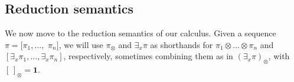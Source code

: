\documentclass{llncs}
\def\1{{\mathbf 1}}
\newcommand{\tell}{{\bf tell}}
\newcommand{\ask}{{\bf ask}}
\newcommand{\ostop}{{\bf stop}}
\def\1{{\mathbf 1}}
\begin{document}

\subsection{Reduction semantics}
We now move to the reduction semantics of our calculus. 
%
Given a sequence $\pi = [\pi_1, \ldots,$ $\pi_n]$, we will use 
$\pi_\otimes$ and $\exists_x \pi$
as shorthands for $\pi_1 \otimes \ldots \otimes \pi_n$ and
$[\exists_x \pi_1, \ldots, \exists_x \pi_n]$, respectively,
sometimes combining them as in $(\exists_x \pi)_\otimes$,
with $[\,]_\otimes = \1$.
\end{document}
